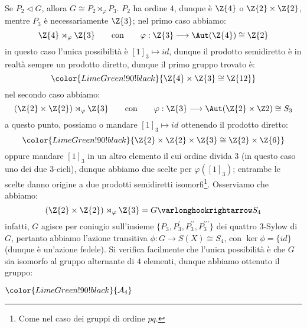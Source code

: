 \documentclass[11pt]{scrartcl}
\begin{document}
\begin{example}
    Se $P_2 \triangleleft G$, allora $G \cong P_2 \rtimes_{\varphi} P_3$. $P_2$ ha ordine $4$, dunque è $\Z{4}$ o $\Z{2} \times \Z{2}$, mentre $P_3$ è necessariamente $\Z{3}$; nel primo caso abbiamo:
                \[ \Z{4} \rtimes_{\varphi} \Z{3} \qquad \text{con} \qquad \varphi : \Z{3} \longrightarrow \Aut(\Z{4}) \cong \Z{2}
                    \]
    in questo caso l'unica possibilità è $[1]_3 \longmapsto id$, dunque il prodotto semidiretto è in realtà sempre un prodotto diretto, dunque il primo gruppo trovato è:
                \[ \color{LimeGreen!90!black}{\Z{4} \times \Z{3} \cong \Z{12}}
                    \]
    nel secondo caso abbiamo:
                \[ (\Z{2} \times \Z{2}) \rtimes_{\varphi} \Z{3} \qquad \text{con} \qquad \varphi : \Z{3} \longrightarrow \Aut(\Z{2} \times \Z2) \cong S_3
                    \]
    a questo punto, possiamo o mandare $[1]_3 \longmapsto id$ ottenendo il prodotto diretto:
            \[ \color{LimeGreen!90!black}{\Z{2} \times \Z{2} \times \Z{3} \cong \Z{2} \times \Z{6}}
                \]
    oppure mandare $[1]_3$ in un altro elemento il cui ordine divida $3$ (in questo caso uno dei due $3$-cicli),
    dunque abbiamo due scelte per $\varphi([1]_3)$; entrambe le scelte danno origine a due prodotti semidiretti isomorfi\footnote{Come nel caso dei gruppi di ordine $pq$.}.
    Osserviamo che abbiamo:
                \[ (\Z{2} \times \Z{2}) \rtimes_{\varphi} \Z{3} = G \varlonghookrightarrow S_4
                    \]
    infatti, $G$ agisce per coniugio sull'insieme $\{P_3,P_3^{\prime},P_3^{\prime\prime},P_3^{\prime\prime\prime}\}$ dei quattro $3$-Sylow di $G$, pertanto abbiamo l'azione transitiva
    $\phi : G \longrightarrow S(X) \cong S_4$, con $\ker \phi = \{id\}$ (dunque è un'azione fedele).
    Si verifica facilmente che l'unica possibilità è che $G$ sia isomorfo al gruppo alternante di $4$ elementi, dunque abbiamo ottenuto il gruppo:
        \begin{center}
            $\color{LimeGreen!90!black}{\mathcal{A}_4}$
        \end{center}
\end{example}
\nopagebreak 
\end{document}
